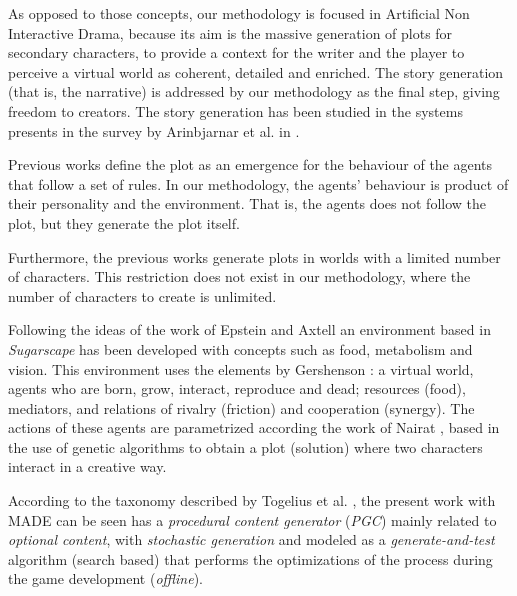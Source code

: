 \documentclass{sig-alternate}
\begin{document}
As opposed to those concepts, our methodology is focused in Artificial Non
Interactive Drama, because its aim is the massive generation of plots
for secondary characters, to provide a context for the writer and the
player to perceive a virtual world as coherent, detailed and
enriched. The story generation (that is, the narrative) is addressed 
by our methodology as the final step, giving freedom to creators. The story generation has been studied in the systems presents in
the survey by Arinbjarnar et al. in \cite{ReviewArinbjarnar09}. 


Previous works define the plot as an emergence for the behaviour of the agents that follow a set of rules. In our methodology, the agents' behaviour is product of their personality and the environment. That is, the agents does not follow the plot, but they generate the plot itself.


Furthermore, the previous works generate plots in worlds with a limited number of characters. This restriction does not exist in our methodology, where the number of characters to create is unlimited.



Following the ideas of the work of Epstein and Axtell
\cite{epstein1996growing} an environment based in {\em Sugarscape} has
been developed with concepts such as food, metabolism and
vision. This environment uses the elements by Gershenson
\cite{gershenson2005general}: a virtual world, agents who are born, grow, 
interact, reproduce and dead; resources (food), mediators, and
relations of rivalry (friction) and cooperation (synergy). The actions
of these agents are parametrized according the work of Nairat
\cite{nairat2011character}, based in the use of genetic algorithms to
obtain a plot (solution) where two characters interact in a creative way.

According to the taxonomy described by Togelius et al. \cite{Togelius2011}, the present work
with MADE can be seen has a \textit{procedural content generator} (\textit{PGC})
mainly related to \textit{optional content}, with \textit{stochastic generation}
and modeled as a \textit{generate-and-test} algorithm (search based) that
performs the optimizations of the process during the game development (\textit{offline}).

\end{document}
